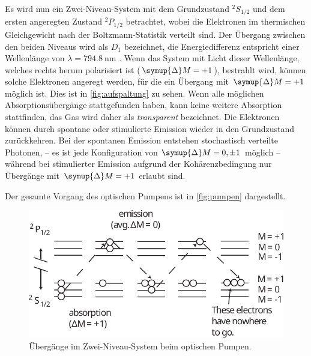     Es wird nun ein Zwei-Niveau-System mit dem Grundzustand $^2S_{1/2}$ und dem ersten angeregten Zustand $^2P_{1/2}$ betrachtet,
    wobei die Elektronen im thermischen Gleichgewicht nach der Boltzmann-Statistik verteilt sind.
    Der Übergang zwischen den beiden Niveaus wird als $D_1$ bezeichnet,
    die Energiedifferenz entspricht einer Wellenlänge von $\lambda = \SI{794.8}{\nano\meter}$ \cite{versuchsanleitung}.
    Wenn das System mit Licht dieser Wellenlänge,
    welches rechts herum polarisiert ist ($\symup{\Delta}M = +1$),
    bestrahlt wird,
    können solche Elektronen angeregt werden,
    für die ein Übergang mit $\symup{\Delta}M = +1$ möglich ist.
    Dies ist in \autoref{fig:aufspaltung} zu sehen.
    Wenn alle möglichen Absorptionsübergänge stattgefunden haben,
    kann keine weitere Absorption stattfinden,
    das Gas wird daher als \textit{transparent} bezeichnet.
    Die Elektronen können durch spontane oder stimulierte Emission wieder in den Grundzustand zurückkehren.
    Bei der spontanen Emission entstehen stochastisch verteilte Photonen,
    – es ist jede Konfiguration von $\symup{\Delta}M = 0, \pm 1$ möglich –
    während bei stimulierter Emission aufgrund der Kohärenzbedingung nur Übergänge mit $\symup{\Delta}M = +1$ erlaubt sind.

    Der gesamte Vorgang des optischen Pumpens ist in \autoref{fig:pumpen} dargestellt.
    \begin{figure}[H]
        \centering
        \includegraphics[scale=0.8]{content/img/Lit2_Abb_8.pdf}
        \caption{Übergänge im Zwei-Niveau-System beim optischen Pumpen. \cite{caltech}}
        \label{fig:pumpen}
    \end{figure}

